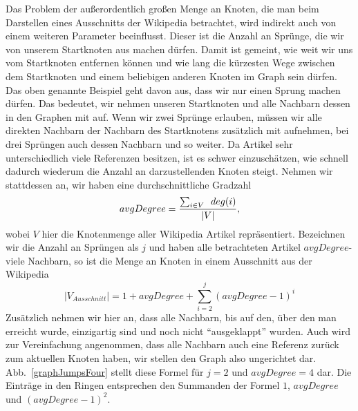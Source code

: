 \documentclass[12pt, a4paper]{article}
\begin{document}
Das Problem der außerordentlich großen Menge an Knoten, die man beim Darstellen eines Ausschnitts der Wikipedia betrachtet, wird indirekt auch von einem weiteren Parameter beeinflusst. Dieser ist die Anzahl an Sprünge, die wir von unserem Startknoten aus machen dürfen. Damit ist gemeint, wie weit wir uns vom Startknoten entfernen können und wie lang die kürzesten Wege zwischen dem Startknoten und einem beliebigen anderen Knoten im Graph sein dürfen. Das oben genannte Beispiel geht davon aus, dass wir nur einen Sprung machen dürfen. Das bedeutet, wir nehmen unseren Startknoten und alle Nachbarn dessen in den Graphen mit auf. Wenn wir zwei Sprünge erlauben, müssen wir alle direkten Nachbarn der Nachbarn des Startknotens zusätzlich mit aufnehmen, bei drei Sprüngen auch dessen Nachbarn und so weiter. Da Artikel sehr unterschiedlich viele Referenzen besitzen, ist es schwer einzuschätzen, wie schnell dadurch wiederum die Anzahl an darzustellenden Knoten steigt. Nehmen wir stattdessen an, wir haben eine durchschnittliche Gradzahl
\begin{equation} \label{avgDegree}
avgDegree = \frac{\sum_{i \in V} \enskip deg(i)}{|V|},
\end{equation}
wobei $V$ hier die Knotenmenge aller Wikipedia Artikel repräsentiert. Bezeichnen wir die Anzahl an Sprüngen als $j$ und haben alle betrachteten Artikel $avgDegree$-viele Nachbarn, so ist die Menge an Knoten in einem Ausschnitt aus der Wikipedia
\begin{equation} \label{nodeAmountAvg}
|V_{Ausschnitt}| = 1+avgDegree+\sum_{i=2}^{j} (avgDegree-1)^i
\end{equation}
Zusätzlich nehmen wir hier an, dass alle Nachbarn, bis auf den, über den man erreicht wurde, einzigartig sind und noch nicht "`ausgeklappt"' wurden. Auch wird zur Vereinfachung angenommen, dass alle Nachbarn auch eine Referenz zurück zum aktuellen Knoten haben, wir stellen den Graph also ungerichtet dar. Abb.~\ref{graphJumpsFour} stellt diese Formel für $j=2$ und $avgDegree=4$ dar. Die Einträge in den Ringen entsprechen den Summanden der Formel $1$, $avgDegree$ und $(avgDegree-1)^2$.\\
\end{document}
